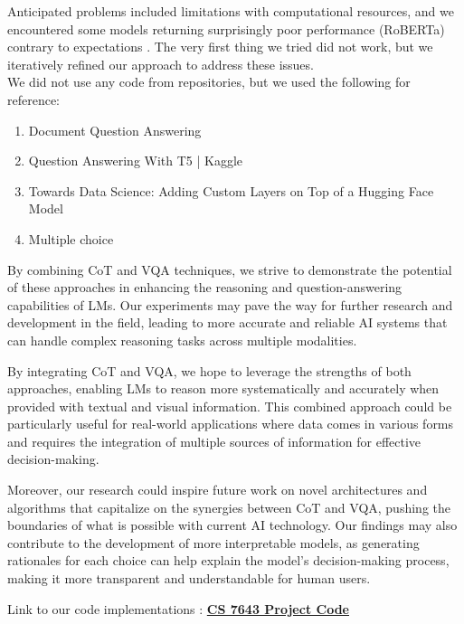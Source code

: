 \documentclass[10pt,twocolumn,letterpaper]{article}
\begin{document}
Anticipated problems included limitations with computational resources, and we encountered some models returning surprisingly poor performance (RoBERTa) contrary to expectations \cite{Liu19}. The very first thing we tried did not work, but we iteratively refined our approach to address these issues.\\

We did not use any code from repositories, but we used the following for reference:

\begin{enumerate}
    \item Document Question Answering \cite{HuggingFaceDocsDQA}
    \item Question Answering With T5 | Kaggle \cite{abdokamr_2021}
    \item Towards Data Science: Adding Custom Layers on Top of a Hugging Face Model \cite{TDS20}
    \item Multiple choice \cite{MultipleChoice}
\end{enumerate}

By combining CoT and VQA techniques, we strive to demonstrate the potential of these approaches in enhancing the reasoning and question-answering capabilities of LMs. Our experiments may pave the way for further research and development in the field, leading to more accurate and reliable AI systems that can handle complex reasoning tasks across multiple modalities.

By integrating CoT and VQA, we hope to leverage the strengths of both approaches, enabling LMs to reason more systematically and accurately when provided with textual and visual information. This combined approach could be particularly useful for real-world applications where data comes in various forms and requires the integration of multiple sources of information for effective decision-making.

Moreover, our research could inspire future work on novel architectures and algorithms that capitalize on the synergies between CoT and VQA, pushing the boundaries of what is possible with current AI technology. Our findings may also contribute to the development of more interpretable models, as generating rationales for each choice can help explain the model's decision-making process, making it more transparent and understandable for human users.

Link to our code implementations : \href{https://github.com/tomohiro-sawada/cs7643-final-project}{\textbf{CS 7643 Project Code}}
\end{document}
